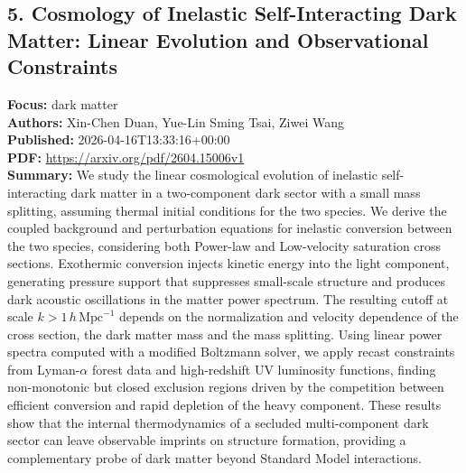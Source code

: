 \documentclass[11pt]{article}
\begin{document}
\subsection*{5. Cosmology of Inelastic Self-Interacting Dark Matter: Linear Evolution and Observational Constraints}
\textbf{Focus:} dark matter\\
\textbf{Authors:} Xin-Chen Duan, Yue-Lin Sming Tsai, Ziwei Wang\\
\textbf{Published:} 2026-04-16T13:33:16+00:00\\
\textbf{PDF:} \href{https://arxiv.org/pdf/2604.15006v1}{https://arxiv.org/pdf/2604.15006v1}\\
\textbf{Summary:}
We study the linear cosmological evolution of inelastic self-interacting dark matter in a two-component dark sector with a small mass splitting, assuming thermal initial conditions for the two species. We derive the coupled background and perturbation equations for inelastic conversion between the two species, considering both Power-law and Low-velocity saturation cross sections. Exothermic conversion injects kinetic energy into the light component, generating pressure support that suppresses small-scale structure and produces dark acoustic oscillations in the matter power spectrum. The resulting cutoff at scale $k > 1\,h\,\mathrm{Mpc}^{-1}$ depends on the normalization and velocity dependence of the cross section, the dark matter mass and the mass splitting. Using linear power spectra computed with a modified Boltzmann solver, we apply recast constraints from Lyman-$\alpha $ forest data and high-redshift UV luminosity functions, finding non-monotonic but closed exclusion regions driven by the competition between efficient conversion and rapid depletion of the heavy component. These results show that the internal thermodynamics of a secluded multi-component dark sector can leave observable imprints on structure formation, providing a complementary probe of dark matter beyond Standard Model interactions.
\end{document}

